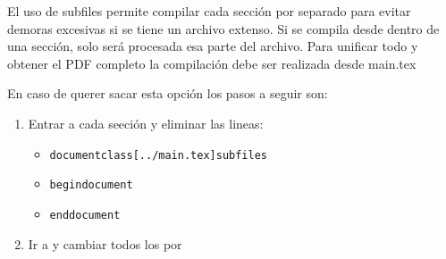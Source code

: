 

El uso de subfiles permite compilar cada sección por separado para evitar demoras excesivas si se tiene un archivo extenso.
Si se compila desde dentro de una sección, solo será procesada esa parte del archivo. Para unificar todo y obtener el PDF completo la compilación debe ser realizada desde main.tex

En caso de querer sacar esta opción los pasos a seguir son:
\begin{enumerate}
    \item Entrar a cada seeción y eliminar las lineas:
        \begin{itemize}
            \item \texttt{documentclass[../main.tex]{subfiles}}
            \item \texttt{begin{document}}
            \item \texttt{end{document}}
        \end{itemize}
    \item Ir a  y cambiar todos los  por 
\end{enumerate}

